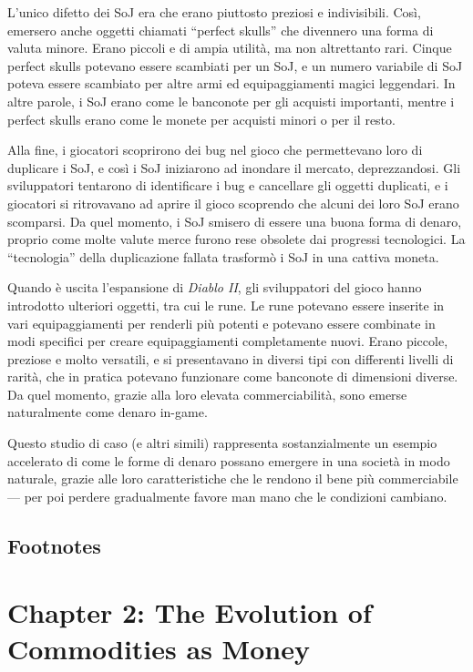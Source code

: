\documentclass[
  a5paper,
  smalldemyvopaper,10pt,twoside,onecolumn,openright,extrafontsizes,hidelinks]{memoir}
\begin{document}
L'unico difetto dei SoJ era che erano piuttosto preziosi e indivisibili.
Così, emersero anche oggetti chiamati ``perfect skulls'' che divennero
una forma di valuta minore. Erano piccoli e di ampia utilità, ma non
altrettanto rari. Cinque perfect skulls potevano essere scambiati per un
SoJ, e un numero variabile di SoJ poteva essere scambiato per altre armi
ed equipaggiamenti magici leggendari. In altre parole, i SoJ erano come
le banconote per gli acquisti importanti, mentre i perfect skulls erano
come le monete per acquisti minori o per il resto.

Alla fine, i giocatori scoprirono dei bug nel gioco che permettevano
loro di duplicare i SoJ, e così i SoJ iniziarono ad inondare il mercato,
deprezzandosi. Gli sviluppatori tentarono di identificare i bug e
cancellare gli oggetti duplicati, e i giocatori si ritrovavano ad aprire
il gioco scoprendo che alcuni dei loro SoJ erano scomparsi. Da quel
momento, i SoJ smisero di essere una buona forma di denaro, proprio come
molte valute merce furono rese obsolete dai progressi tecnologici. La
``tecnologia'' della duplicazione fallata trasformò i SoJ in una cattiva
moneta.

Quando è uscita l'espansione di \emph{Diablo II}, gli sviluppatori del
gioco hanno introdotto ulteriori oggetti, tra cui le rune. Le rune
potevano essere inserite in vari equipaggiamenti per renderli più
potenti e potevano essere combinate in modi specifici per creare
equipaggiamenti completamente nuovi. Erano piccole, preziose e molto
versatili, e si presentavano in diversi tipi con differenti livelli di
rarità, che in pratica potevano funzionare come banconote di dimensioni
diverse. Da quel momento, grazie alla loro elevata commerciabilità, sono
emerse naturalmente come denaro in-game.

Questo studio di caso (e altri simili) rappresenta sostanzialmente un
esempio accelerato di come le forme di denaro possano emergere in una
società in modo naturale, grazie alle loro caratteristiche che le
rendono il bene più commerciabile --- per poi perdere gradualmente
favore man mano che le condizioni cambiano.

\section{Footnotes}\label{footnotes-1}


\chapter{\texorpdfstring{Chapter 2: \textbf{The Evolution of Commodities
as
Money}}{Chapter 2: The Evolution of Commodities as Money}}\label{chapter-2-the-evolution-of-commodities-as-money}
\end{document}
